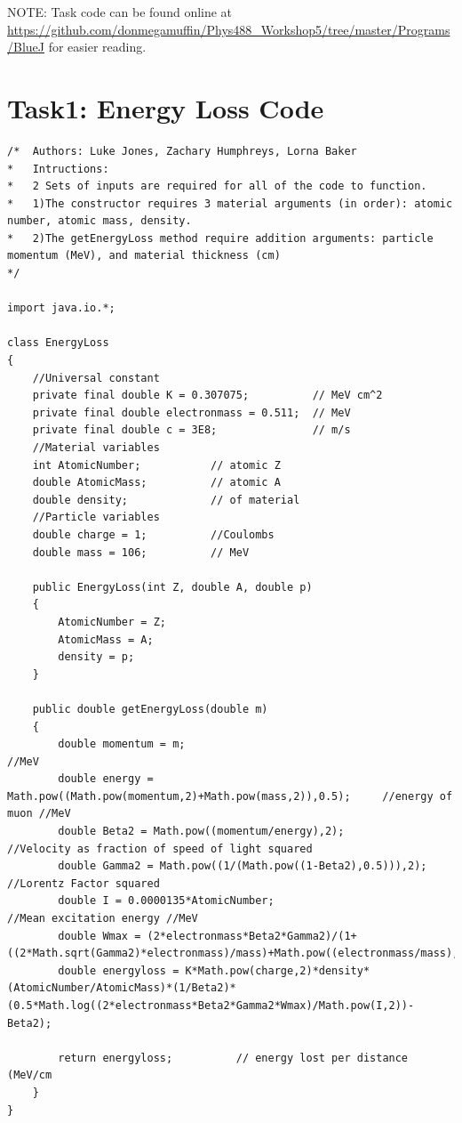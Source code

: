 \documentclass[twocolumn]{article}
\begin{document}
\appendix
\onecolumn
\scriptsize
NOTE: Task code can be found online at \url{https://github.com/donmegamuffin/Phys488_Workshop5/tree/master/Programs/BlueJ} for easier reading.
\section{Task1: Energy Loss Code}
\begin{verbatim}
/*  Authors: Luke Jones, Zachary Humphreys, Lorna Baker
*   Intructions: 
*   2 Sets of inputs are required for all of the code to function.
*   1)The constructor requires 3 material arguments (in order): atomic number, atomic mass, density.
*   2)The getEnergyLoss method require addition arguments: particle momentum (MeV), and material thickness (cm)
*/

import java.io.*;

class EnergyLoss
{   
	//Universal constant
	private final double K = 0.307075;          // MeV cm^2
	private final double electronmass = 0.511;  // MeV
	private final double c = 3E8;               // m/s     
	//Material variables
	int AtomicNumber;           // atomic Z
	double AtomicMass;          // atomic A
	double density;             // of material
	//Particle variables
	double charge = 1;          //Coulombs
	double mass = 106;          // MeV
	
	public EnergyLoss(int Z, double A, double p) 
	{
		AtomicNumber = Z;
		AtomicMass = A;
		density = p;       
	}
	
	public double getEnergyLoss(double m)
	{
		double momentum = m;                                                       //MeV
		double energy = Math.pow((Math.pow(momentum,2)+Math.pow(mass,2)),0.5);     //energy of muon //MeV      
		double Beta2 = Math.pow((momentum/energy),2);                              //Velocity as fraction of speed of light squared
		double Gamma2 = Math.pow((1/(Math.pow((1-Beta2),0.5))),2);                 //Lorentz Factor squared
		double I = 0.0000135*AtomicNumber;                                         //Mean excitation energy //MeV
		double Wmax = (2*electronmass*Beta2*Gamma2)/(1+((2*Math.sqrt(Gamma2)*electronmass)/mass)+Math.pow((electronmass/mass),2));
		double energyloss = K*Math.pow(charge,2)*density*(AtomicNumber/AtomicMass)*(1/Beta2)*(0.5*Math.log((2*electronmass*Beta2*Gamma2*Wmax)/Math.pow(I,2))-Beta2);
		
		return energyloss;          // energy lost per distance (MeV/cm
	}    
}


\end{verbatim}
\end{document}
